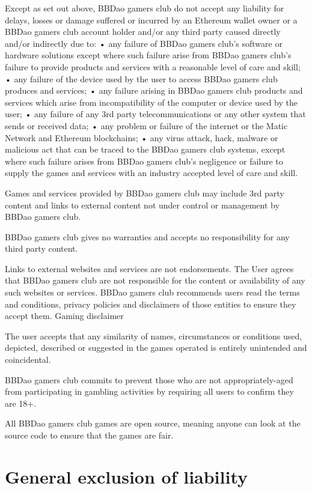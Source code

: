 \documentclass[
]{book}
\begin{document}
Except as set out above, BBDao gamers club do not accept any liability for delays, losses or damage suffered or incurred by an Ethereum wallet owner or a BBDao gamers club account holder and/or any third party caused directly and/or indirectly due to:
• any failure of BBDao gamers club's software or hardware solutions except where such failure arise from BBDao gamers club's failure to provide products and services with a reasonable level of care and skill;
• any failure of the device used by the user to access BBDao gamers club produces and services;
• any failure arising in BBDao gamers club products and services which arise from incompatibility of the computer or device used by the user;
• any failure of any 3rd party telecommunications or any other system that sends or received data;
• any problem or failure of the internet or the Matic Network and Ethereum blockchains;
• any virus attack, hack, malware or malicious act that can be traced to the BBDao gamers club systems, except where such failure arises from BBDao gamers club's negligence or failure to supply the games and services with an industry accepted level of care and skill.

Games and services provided by BBDao gamers club may include 3rd party content and links to external content not under control or management by BBDao gamers club.

BBDao gamers club gives no warranties and accepts no responsibility for any third party content.

Links to external websites and services are not endorsements. The User agrees that BBDao gamers club are not responsible for the content or availability of any such websites or services. BBDao gamers club recommends users read the terms and conditions, privacy policies and disclaimers of those entities to ensure they accept them.
Gaming disclaimer

The user accepts that any similarity of names, circumstances or conditions used, depicted, described or suggested in the games operated is entirely unintended and coincidental.

BBDao gamers club commits to prevent those who are not appropriately-aged from participating in gambling activities by requiring all users to confirm they are 18+.

All BBDao gamers club games are open source, meaning anyone can look at the source code to ensure that the games are fair.

\hypertarget{general-exclusion-of-liability}{%
\section{General exclusion of liability}\label{general-exclusion-of-liability}}
\end{document}
